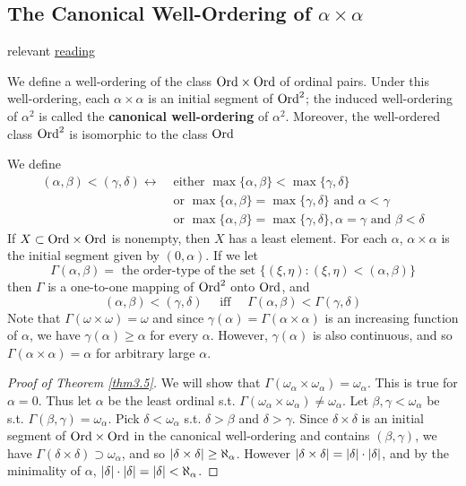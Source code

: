\documentclass[11pt]{article}
\begin{document}
\subsection{The Canonical Well-Ordering of \texorpdfstring{\(\alpha\times\alpha\)}{α×α}}
\label{sec:orga6fbf92}
relevant \href{https://planetmath.org/canonicalorderingonpairsofordinals}{reading}

We define a well-ordering of the class \(\text{Ord}\times\text{Ord}\) of ordinal pairs. Under this well-ordering,
each \(\alpha\times\alpha\) is an initial segment of \(\text{Ord}^2\); the induced well-ordering of \(\alpha^2\) is called
the \textbf{canonical well-ordering} of \(\alpha^2\). Moreover, the well-ordered class \(\text{Ord}^2\) is isomorphic
to the class \(\text{Ord}\)

We define
\begin{align*}
(\alpha,\beta)<(\gamma,\delta)\leftrightarrow\;&\text{either }\max\{\alpha,\beta\}<\max\{\gamma,\delta\}\\
&\text{or }\max\{\alpha,\beta\}=\max\{\gamma,\delta\}\text{ and }\alpha<\gamma\\
&\text{or }\max\{\alpha,\beta\}=\max\{\gamma,\delta\},\alpha=\gamma\text{ and }\beta<\delta
\end{align*}
If \(X\subset\text{Ord}\times\text{Ord}\) is nonempty, then \(X\) has a least element. For each \(\alpha\), \(\alpha\times\alpha\) is the
initial segment given by \((0,\alpha)\). If we let
\begin{equation*}
\Gamma(\alpha,\beta)=\text{ the order-type of the set }\{(\xi,\eta):(\xi,\eta)<(\alpha,\beta)\}
\end{equation*}
then \(\Gamma\) is a one-to-one mapping of \(\text{Ord}^2\) onto \(\text{Ord}\), and
\begin{equation*}
(\alpha,\beta)<(\gamma,\delta) \quad\text{ iff }\quad \Gamma(\alpha,\beta)<\Gamma(\gamma,\delta)
\end{equation*}
Note that \(\Gamma(\omega\times\omega)=\omega\) and since \(\gamma(\alpha)=\Gamma(\alpha\times\alpha)\) is an increasing function of \(\alpha\), we
have \(\gamma(\alpha)\ge\alpha\) for every \(\alpha\). However, \(\gamma(\alpha)\) is also continuous, and so \(\Gamma(\alpha\times\alpha)=\alpha\) for
arbitrary large \(\alpha\). \label{Question3}

\begin{proof}[Proof of Theorem \ref{thm3.5}]
We will show that \(\Gamma(\omega_\alpha\times\omega_\alpha)=\omega_\alpha\). This is true for \(\alpha=0\). Thus let \(\alpha\) be the least ordinal
s.t. \(\Gamma(\omega_\alpha\times\omega_\alpha)\neq\omega_\alpha\). Let \(\beta,\gamma<\omega_\alpha\) be s.t. \(\Gamma(\beta,\gamma)=\omega_\alpha\). Pick \(\delta<\omega_\alpha\) s.t. \(\delta>\beta\)
and \(\delta>\gamma\). Since \(\delta\times\delta\) is an initial segment of \(\text{Ord}\times\text{Ord}\) in the canonical well-ordering
and contains \((\beta,\gamma)\), we have \(\Gamma(\delta\times\delta)\supset\omega_\alpha\), and so \(\abs{\delta\times\delta}\ge\aleph_\alpha\).
However \(\abs{\delta\times\delta}=\abs{\delta}\cdot\abs{\delta}\), and by the minimality of \(\alpha\), \(\abs{\delta}\cdot\abs{\delta}=\abs{\delta}<\aleph_\alpha\).
\end{proof}
\end{document}
